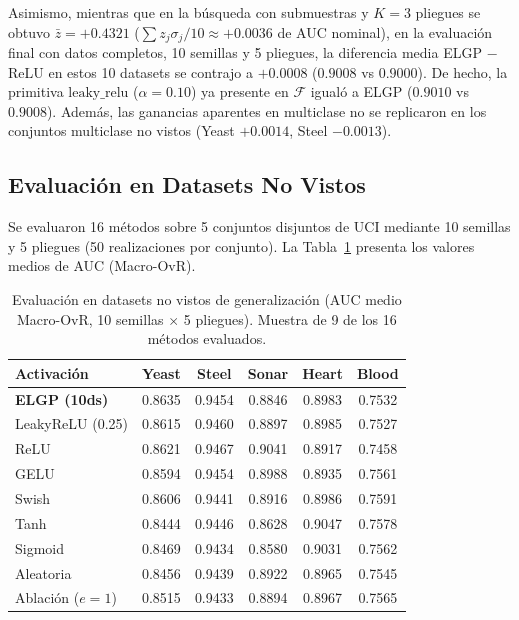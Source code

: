 \documentclass[10pt,twocolumn,letterpaper]{article}
\begin{document}
Asimismo, mientras que en la búsqueda con submuestras y $K=3$ pliegues se obtuvo $\bar{z}=+0.4321$ ($\sum z_j \sigma_j / 10 \approx +0.0036$ de AUC nominal), en la evaluación final con datos completos, 10 semillas y 5 pliegues, la diferencia media ELGP $-$ ReLU en estos 10 datasets se contrajo a $+0.0008$ ($0.9008$ vs $0.9000$). De hecho, la primitiva $\mathrm{leaky\_relu}$ ($\alpha=0.10$) ya presente en $\mathcal{F}$ igualó a ELGP ($0.9010$ vs $0.9008$). Además, las ganancias aparentes en multiclase no se replicaron en los conjuntos multiclase no vistos (Yeast $+0.0014$, Steel $-0.0013$).

\subsection{Evaluación en Datasets No Vistos}
Se evaluaron 16 métodos sobre 5 conjuntos disjuntos de UCI mediante 10 semillas y 5 pliegues (50 realizaciones por conjunto). La Tabla~\ref{tab:generalizacion} presenta los valores medios de AUC (Macro-OvR).

\begin{table}[!htbp]
\centering
\footnotesize
\setlength{\tabcolsep}{3pt}
\caption{Evaluación en datasets no vistos de generalización (AUC medio Macro-OvR, 10 semillas $\times$ 5 pliegues). Muestra de 9 de los 16 métodos evaluados.}
\label{tab:generalizacion}
\begin{tabularx}{\columnwidth}{@{}>{\raggedright\arraybackslash}Xccccc@{}}
\toprule
Activación & Yeast & Steel & Sonar & Heart & Blood \\
\midrule
\textbf{ELGP (10ds)} & 0.8635 & 0.9454 & 0.8846 & 0.8983 & 0.7532 \\
LeakyReLU (0.25)     & 0.8615 & 0.9460 & 0.8897 & 0.8985 & 0.7527 \\
ReLU                 & 0.8621 & 0.9467 & 0.9041 & 0.8917 & 0.7458 \\
GELU                 & 0.8594 & 0.9454 & 0.8988 & 0.8935 & 0.7561 \\
Swish                & 0.8606 & 0.9441 & 0.8916 & 0.8986 & 0.7591 \\
Tanh                 & 0.8444 & 0.9446 & 0.8628 & 0.9047 & 0.7578 \\
Sigmoid              & 0.8469 & 0.9434 & 0.8580 & 0.9031 & 0.7562 \\
Aleatoria            & 0.8456 & 0.9439 & 0.8922 & 0.8965 & 0.7545 \\
Ablación ($e=1$)     & 0.8515 & 0.9433 & 0.8894 & 0.8967 & 0.7565 \\
\bottomrule
\end{tabularx}
\end{table}
\end{document}
